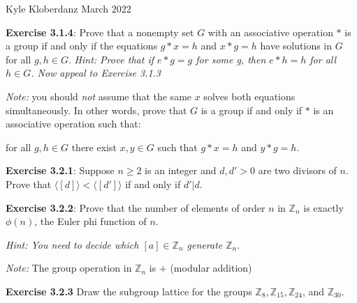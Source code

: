 \documentclass[a4paper]{article}
\begin{document}
\begin{myparindent}{0pt}

Kyle Kloberdanz  March 2022 \newline

\textbf{Exercise 3.1.4}:
Prove that a nonempty set $G$ with an associative operation $*$ is a group if
and only if the equations $g * x = h$ and $x * g = h$ have solutions in $G$
for all $g, h \in G$. \textit{Hint: Prove that if $e * g = g$ for some g, then
$e * h = h$ for all $h \in G$. Now appeal to Exercise 3.1.3} \newline

\textit{Note:} you should \textit{not} assume that the same $x$ solves both
equations simultaneously. In other words, prove that $G$ is a group if and only
if $*$ is an associative operation such that: \newline

for all $g, h \in G$ there exist $x, y \in G$ such that $g * x = h$ and $y * g = h$.
\newline

\textbf{Exercise 3.2.1}:
Suppose $n \ge 2$ is an integer and $d, d' > 0$ are two divisors of $n$. Prove
that $\langle [d] \rangle < \langle [d'] \rangle$ if and only if $d'|d$.
\newline

\textbf{Exercise 3.2.2}:
Prove that the number of elements of order $n$ in $\mathbb{Z}_n$ is exactly
$\phi(n)$, the Euler phi function of $n$.

\textit{Hint: You need to decide which $[a] \in \mathbb{Z}_n$ generate $\mathbb{Z}_n$}.
\newline

\textit{Note:} The group operation in $\mathbb{Z}_n$ is $+$ (modular addition)
\newline

\textbf{Exercise 3.2.3}
Draw the subgroup lattice for the groups
$\mathbb{Z}_8, \mathbb{Z}_{15}, \mathbb{Z}_{24}$, and $\mathbb{Z}_{30}$.
\newline


\end{myparindent}
\end{document}
